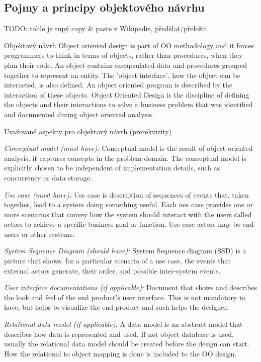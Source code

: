 \subsection{Pojmy a principy objektového návrhu}

TODO: tohle je tupý copy \& paste z Wikipedie, předělat/přeložit

\begin{definiceN}{Objektový návrh}
Object oriented design is part of OO methodology and it forces programmers to think in terms of objects, rather than procedures, when they plan their code. An object contains encapsulated data and procedures grouped together to represent an entity. The 'object interface', how the object can be interacted, is also defined. An object oriented program is described by the interaction of these objects. Object Oriented Design is the discipline of defining the objects and their interactions to solve a business problem that was identified and documented during object oriented analysis.
\end{definiceN}

\begin{obecne}{Uvažované aspekty pro objektový návrh (prerekvizity)}
\begin{pitemize}
    \item \emph{Conceptual model (must have):} Conceptual model is the result of object-oriented analysis, it captures concepts in the problem domain. The conceptual model is explicitly chosen to be independent of implementation details, such as concurrency or data storage.
    \item \emph{Use case (must have):} Use case is description of sequences of events that, taken together, lead to a system doing something useful. Each use case provides one or more scenarios that convey how the system should interact with the users called actors to achieve a specific business goal or function. Use case actors may be end users or other systems.
    \item \emph{System Sequence Diagram (should have):} System Sequence diagram (SSD) is a picture that shows, for a particular scenario of a use case, the events that external actors generate, their order, and possible inter-system events.
    \item \emph{User interface documentations (if applicable):} Document that shows and describes the look and feel of the end product's user interface. This is not mandatory to have, but helps to visualize the end-product and such helps the designer.
    \item \emph{Relational data model (if applicable):} A data model is an abstract model that describes how data is represented and used. If not object database is used, usually the relational data model should be created before the design can start. How the relational to object mapping is done is included to the OO design.
\end{pitemize}
\end{obecne}

